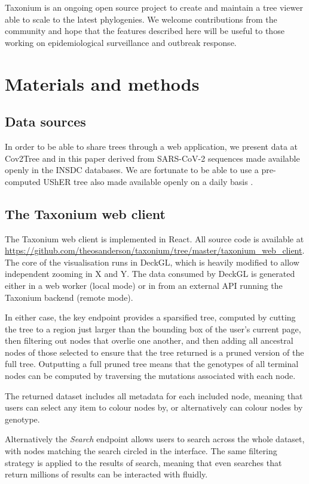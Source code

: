 Taxonium is an ongoing open source project to create and maintain a tree viewer able to scale to the latest phylogenies. We welcome contributions from the community and hope that the features described here will be useful to those working on epidemiological surveillance and outbreak response.

\clearpage{}
\section*{Materials and methods}

\subsection*{Data sources}
In order to be able to share trees through a web application, we present data at Cov2Tree and in this paper derived from SARS-CoV-2 sequences made available openly in the INSDC databases. We are fortunate to be able to use a pre-computed UShER tree also made available openly on a daily basis \citep{McBroome2021}.

\subsection*{The Taxonium web client}
The Taxonium web client is implemented in React. All source code is available at \url{https://github.com/theosanderson/taxonium/tree/master/taxonium_web_client}. The core of the visualisation runs in DeckGL, which is heavily modified to allow independent zooming in X and Y. The data consumed by DeckGL is generated either in a web worker (local mode) or in from an external API running the Taxonium backend (remote mode).

In either case, the key endpoint provides a sparsified tree, computed by cutting the tree to a region just larger than the bounding box of the user's current page, then filtering out nodes that overlie one another, and then adding all ancestral nodes of those selected to ensure that the tree returned is a pruned version of the full tree. Outputting a full pruned tree means that the genotypes of all terminal nodes can be computed by traversing the mutations associated with each node.

The returned dataset includes all metadata for each included node, meaning that users can select any item to colour nodes by, or alternatively can colour nodes by genotype.

Alternatively the \emph{Search} endpoint allows users to search across the whole dataset, with nodes matching the search circled in the interface. The same filtering strategy is applied to the results of search, meaning that even searches that return millions of results can be interacted with fluidly.

